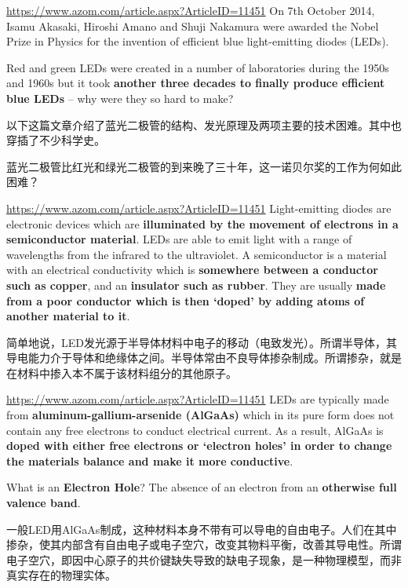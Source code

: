 \documentclass{beamer}
\newenvironment{slide}{
    \begin{frame}{\bfseries{\sectiontitle}}
}{
    \end{frame}
}
\begin{document}
\begin{slide}{\url{https://www.azom.com/article.aspx?ArticleID=11451}}
    On 7th October 2014, Isamu Akasaki, Hiroshi Amano and Shuji Nakamura were awarded the Nobel Prize in Physics for the invention of efficient blue light-emitting diodes (LEDs).
    \medskip
    
    Red and green LEDs were created in a number of laboratories during the 1950s and 1960s but it took \textbf{another three decades to finally produce efficient blue LEDs} -- why were they so hard to make?
    \bigskip

    以下这篇文章介绍了蓝光二极管的结构、发光原理及两项主要的技术困难。其中也穿插了不少科学史。
    \medskip

    蓝光二极管比红光和绿光二极管的到来晚了三十年，这一诺贝尔奖的工作为何如此困难？
\end{slide}

\begin{slide}{\url{https://www.azom.com/article.aspx?ArticleID=11451}}
    Light-emitting diodes are electronic devices which are \textbf{illuminated by the movement of electrons in a semiconductor material}. LEDs are able to emit light with a range of wavelengths from the infrared to the ultraviolet. A semiconductor is a material with an electrical conductivity which is \textbf{somewhere between a conductor such as copper}, and an \textbf{insulator such as rubber}. They are usually \textbf{made from a poor conductor which is then ‘doped’ by adding atoms of another material to it}.
    \bigskip

    简单地说，LED发光源于半导体材料中电子的移动（电致发光）。所谓半导体，其导电能力介于导体和绝缘体之间。半导体常由不良导体掺杂制成。所谓掺杂，就是在材料中掺入本不属于该材料组分的其他原子。
\end{slide}

\begin{slide}{\url{https://www.azom.com/article.aspx?ArticleID=11451}}
    LEDs are typically made from \textbf{aluminum-gallium-arsenide (AlGaAs)} which in its pure form does not contain any free electrons to conduct electrical current. As a result, AlGaAs is \textbf{doped with either free electrons or ‘electron holes’ in order to change the materials balance and make it more conductive}.
    \medskip

    What is an \textbf{Electron Hole}? The absence of an electron from an \textbf{otherwise full valence band}.
    \bigskip

    一般LED用AlGaAs制成，这种材料本身不带有可以导电的自由电子。人们在其中掺杂，使其内部含有自由电子或电子空穴，改变其物料平衡，改善其导电性。所谓电子空穴，即因中心原子的共价键缺失导致的缺电子现象，是一种物理模型，而非真实存在的物理实体。
\end{slide}
\end{document}
